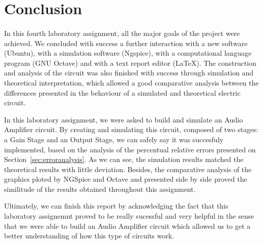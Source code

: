 \section{Conclusion}
\label{sec:conclusion}

\paragraph{}
In this fourth laboratory assignment, all the major goals of the project were achieved. We concluded with success a further interaction with a new software (Ubuntu), with a simulation software (Ngspice), with a computational language program (GNU Octave) and with a text report editor (LaTeX). The construction and analysis of the circuit was also finished with success through simulation and theoretical interpretation, which allowed a good comparative analysis between the differences presented in the behaviour of a simulated and theoretical electric circuit. 

In this laboratory assignment, we were asked to build and simulate an Audio Amplifier circuit. By creating and simulating this circuit, composed of two stages: a Gain Stage and an Output Stage, we can safely say it was succesfuly implemented, based on the analysis of the percentual relative errors presented on Section~\ref{sec:erroranalysis}. As we can see, the simulation results matched the theoretical results with little deviation. Besides, the comparative analysis of the graphics ploted by NGSpice and Octave and presented side by side proved the similitude of the results obtained throughout this assignment. 

Ultimately, we can finish this report by acknowledging the fact that this laboratory assignemnt proved to be really sucessful and very helpful in the sense that we were able to build an Audio Amplifier circuit which allowed us to get a better understanding of how this type of circuits work.

